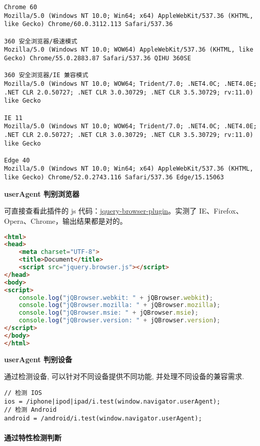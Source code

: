 \begin{lstlisting}
Chrome 60
Mozilla/5.0 (Windows NT 10.0; Win64; x64) AppleWebKit/537.36 (KHTML, like Gecko) Chrome/60.0.3112.113 Safari/537.36

360 安全浏览器/极速模式
Mozilla/5.0 (Windows NT 10.0; WOW64) AppleWebKit/537.36 (KHTML, like Gecko) Chrome/55.0.2883.87 Safari/537.36 QIHU 360SE

360 安全浏览器/IE 兼容模式
Mozilla/5.0 (Windows NT 10.0; WOW64; Trident/7.0; .NET4.0C; .NET4.0E; .NET CLR 2.0.50727; .NET CLR 3.0.30729; .NET CLR 3.5.30729; rv:11.0) like Gecko

IE 11
Mozilla/5.0 (Windows NT 10.0; WOW64; Trident/7.0; .NET4.0C; .NET4.0E; .NET CLR 2.0.50727; .NET CLR 3.0.30729; .NET CLR 3.5.30729; rv:11.0) like Gecko

Edge 40
Mozilla/5.0 (Windows NT 10.0; Win64; x64) AppleWebKit/537.36 (KHTML, like Gecko) Chrome/52.0.2743.116 Safari/537.36 Edge/15.15063
\end{lstlisting}

\textbf{userAgent 判别浏览器}

可直接查看此插件的 js
代码：\href{https://github.com/gabceb/jquery-browser-plugin}{jquery-browser-plugin}。实测了
IE、Firefox、Opera、Chrome，输出结果都是对的。

\begin{lstlisting}[language=HTML]
<html>
<head>
    <meta charset="UTF-8">
    <title>Document</title>
    <script src="jquery.browser.js"></script>
</head>
<body>
<script>
    console.log("jQBrowser.webkit: " + jQBrowser.webkit);
    console.log("jQBrowser.mozilla: " + jQBrowser.mozilla);
    console.log("jQBrowser.msie: " + jQBrowser.msie);
    console.log("jQBrowser.version: " + jQBrowser.version);
</script>
</body>
</html>
\end{lstlisting}

\textbf{userAgent 判别设备}

通过检测设备, 可以针对不同设备提供不同功能, 并处理不同设备的兼容需求.

\begin{lstlisting}
// 检测 IOS
ios = /iphone|ipod|ipad/i.test(window.navigator.userAgent);
// 检测 Android
android = /android/i.test(window.navigator.userAgent);
\end{lstlisting}

\paragraph{通过特性检测判断}\label{ux901aux8fc7ux7279ux6027ux68c0ux6d4bux5224ux65ad}

